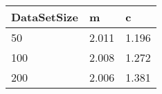 \begin{tabular}{lll}
DataSetSize & m & c \\ 
\hline 
50 & 2.011 & 1.196 \\ 
100 & 2.008 & 1.272 \\ 
200 & 2.006 & 1.381 \\ 
\hline 
\end{tabular}